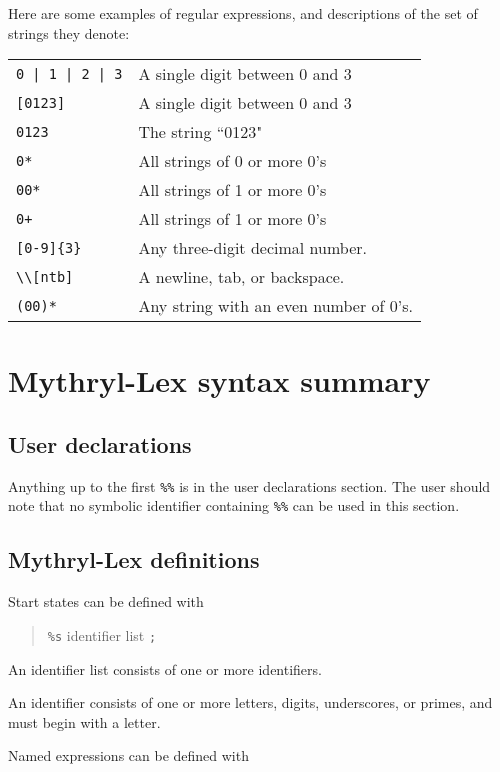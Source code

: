 Here are some examples of regular expressions, and descriptions of the
set of strings they denote:

\begin{tabular}{ll}
\verb~0 | 1 | 2 | 3~&           A single digit between 0 and 3\\
\verb|[0123]|&			A single digit between 0 and 3\\
\verb|0123|&                    The string ``0123"\\
\verb|0*|&                      All strings of 0 or more 0's\\
\verb|00*|&                     All strings of 1  or more 0's\\
\verb|0+|&                      All strings of 1  or more 0's\\
\verb|[0-9]{3}|&		Any three-digit decimal number.\\
\verb|\\[ntb]|&			A newline, tab, or backspace.\\
\verb|(00)*|& Any string with an even number of 0's.
\end{tabular}

\section{Mythryl-Lex syntax summary}

\subsection{User declarations}

Anything up to the first \verb|%%| is in the user declarations section.  The
user should note that no symbolic identifier containing 
\verb|%%| can be
used in this section.

\subsection{Mythryl-Lex definitions}

Start states can be defined with
\begin{quote}
\verb|%s| {identifier list} \verb|;|
\end{quote}

An identifier list consists of one or more identifiers.

An identifier consists of one or more letters, digits, underscores,
or primes, and must begin with a letter.

Named expressions can be defined with

